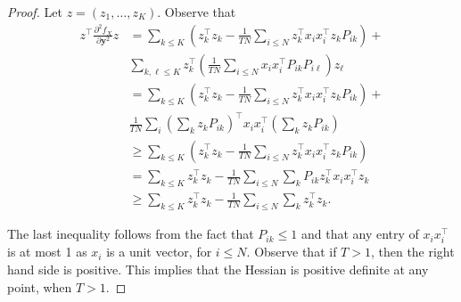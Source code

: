 \begin{proof}
Let $z = \left(z_1, \ldots, z_K\right)$. Observe that
%
\begin{align}
z^\top \frac{\partial^2 f_X}{\partial \mathbf{y}^2} z &= \sum_{k \leq K} \left(z_k^\top z_k - \frac{1}{TN}\sum_{i \leq N}z_k^\top x_i x_i^\top z_k P_{ik}\right) +\\
& \sum_{k, \ell \leq K} z_k^\top\left(\frac{1}{TN}\sum_{i \leq N}x_ix_i^\top P_{ik}P_{i\ell}\right)z_\ell\\
&= \sum_{k \leq K} \left(z_k^\top z_k - \frac{1}{TN}\sum_{i \leq N}z_k^\top x_i x_i^\top z_k P_{ik}\right) +\\
& \frac{1}{TN}\sum_i\left(\sum_{k} z_kP_{ik}\right)^\top x_ix_i^\top \left(\sum_{k} z_kP_{ik}\right)\\
&\geq \sum_{k \leq K} \left(z_k^\top z_k - \frac{1}{TN}\sum_{i \leq N}z_k^\top x_i x_i^\top z_k P_{ik}\right)\\
&= \sum_{k \leq K} z_k^\top z_k - \frac{1}{TN}\sum_{i \leq N}\sum_{k}P_{ik}z_k^\top x_i x_i^\top z_k\\
&\geq \sum_{k \leq K} z_k^\top z_k - \frac{1}{TN}\sum_{i \leq N}\sum_{k}z_k^\top z_k.
\end{align}

The last inequality follows from the fact that $P_{ik} \leq 1$ and that any entry of $x_ix_i^\top$ is at most 1 as $x_i$ is a unit vector, for $i \leq N$. Observe that if $T > 1$, then the right hand side is positive. This implies that the Hessian is positive definite at any point, when $T > 1$.
%
\end{proof}


%
%
